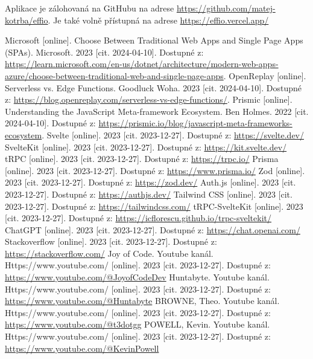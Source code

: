 \documentclass[12pt, a4paper,
openright
]{report}
\let\oldchapter\chapter
\renewcommand{\chapter}{
	\clearpage
	\pagestyle{fancy}
	\oldchapter
}
\begin{document}
\noindent Aplikace je zálohovaná na GitHubu na adrese \url{https://github.com/matej-kotrba/effio}.
Je také volně přístupná na adrese \url{https://effio.vercel.app/}
	
	\renewcommand\bibname{Použité zdroje informací}
	\begin{thebibliography}{99}
		
		 Microsoft [online]. Choose Between Traditional Web Apps and Single Page Apps (SPAs). Microsoft. 2023 [cit. 2024-04-10]. Dostupné z: \url{https://learn.microsoft.com/en-us/dotnet/architecture/modern-web-apps-azure/choose-between-traditional-web-and-single-page-apps}.
		 OpenReplay [online]. Serverless vs. Edge Functions. Goodluck Woha. 2023 [cit. 2024-04-10]. Dostupné z: \url{https://blog.openreplay.com/serverless-vs-edge-functions/}.
		 Prismic [online]. Understanding the JavaScript Meta-framework Ecosystem. Ben Holmes. 2022 [cit. 2024-04-10]. Dostupné z: \url{https://prismic.io/blog/javascript-meta-frameworks-ecosystem}.
		 Svelte [online]. 2023 [cit. 2023-12-27]. Dostupné z: \url{https://svelte.dev/}
		 SvelteKit [online]. 2023 [cit. 2023-12-27]. Dostupné z:  \url{https://kit.svelte.dev/}
		 tRPC [online]. 2023 [cit. 2023-12-27]. Dostupné z: \url{https://trpc.io/}
		 Prisma [online]. 2023 [cit. 2023-12-27]. Dostupné z: \url{https://www.prisma.io/}
		 Zod [online]. 2023 [cit. 2023-12-27]. Dostupné z: \url{https://zod.dev/}
		 Auth.js [online]. 2023 [cit. 2023-12-27]. Dostupné z: \url{https://authjs.dev/}
		 Tailwind CSS [online]. 2023 [cit. 2023-12-27]. Dostupné z: \url{https://tailwindcss.com/}
		 tRPC-SvelteKit [online]. 2023 [cit. 2023-12-27]. Dostupné z: \url{https://icflorescu.github.io/trpc-sveltekit/}
		 ChatGPT [online]. 2023 [cit. 2023-12-27]. Dostupné z: \url{https://chat.openai.com/}
		 Stackoverflow [online]. 2023 [cit. 2023-12-27]. Dostupné z: \url{https://stackoverflow.com/}
		Joy of Code. Youtube kanál. Https://www.youtube.com/ [online]. 2023 [cit. 2023-12-27]. Dostupné z: \url{https://www.youtube.com/@JoyofCodeDev}
		Huntabyte. Youtube kanál. Https://www.youtube.com/ [online]. 2023 [cit. 2023-12-27]. Dostupné z: \url{https://www.youtube.com/@Huntabyte}
		BROWNE, Theo. Youtube kanál. Https://www.youtube.com/ [online]. 2023 [cit. 2023-12-27]. Dostupné z: \url{https://www.youtube.com/@t3dotgg}
		POWELL, Kevin. Youtube kanál. Https://www.youtube.com/ [online]. 2023 [cit. 2023-12-27]. Dostupné z: \url{https://www.youtube.com/@KevinPowell}
		\
		
	\end{thebibliography}
	
	\listoffigures
	

	\appendix %
	
	\titleformat{\chapter}[block]{\scshape\bfseries\LARGE}{Příloha \thechapter}{10pt}{\vspace{0pt}}[\vspace{-22pt}] %

	
\end{document}

